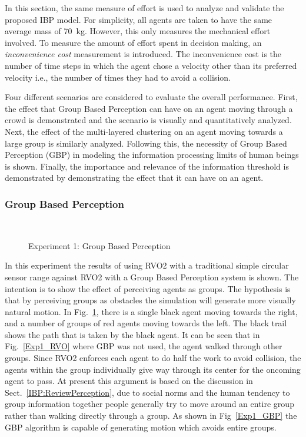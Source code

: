 In this section, the same measure of effort is used to analyze and validate the proposed IBP model. For simplicity, all agents are taken to have the same average mass of 70~kg.  However, this only measures the  mechanical effort involved. To measure the amount of effort spent in decision making, an \emph{inconvenience cost} measurement is introduced. The inconvenience cost is the number of time steps in which the agent chose a velocity other than its preferred velocity i.e., the number of times they had to avoid a collision.

Four different scenarios are considered to evaluate the overall performance. First, the effect that Group Based Perception can have on an agent moving through a crowd is demonstrated and the scenario is visually and quantitatively analyzed. Next, the effect of the multi-layered clustering on an agent moving towards a large group is similarly analyzed. Following this, the necessity of Group Based Perception (GBP) in modeling the information processing limits of human beings is shown. Finally, the importance and relevance of the information threshold is demonstrated by demonstrating the effect that it can have on an agent.

\subsubsection{Group Based Perception}
\label{GBP}

\begin{figure}[!tb]
  \centering
  \\
   \caption{Experiment 1: Group Based Perception}
  \label{Exp1}
\end{figure}


In this experiment the results of using RVO2 with a traditional simple circular sensor range against RVO2 with a Group Based Perception system is shown. The intention is to show the effect of perceiving agents as groups. The hypothesis is that by perceiving groups as obstacles the simulation will generate more visually natural motion. In Fig.~\ref{Exp1}, there is a single black agent moving towards the right, and a number of groups of red agents moving towards the left. The black trail shows the path that is taken by the black agent. It can be seen that in Fig.~\ref{Exp1_RVO} where GBP was not used, the agent walked through other groups. Since RVO2 enforces each agent to do half the work to avoid collision, the agents within the group individually give way through its center for the oncoming agent to pass. At present this argument is based on the discussion in Sect.~\ref{IBP:ReviewPerception}, due to social norms and the human tendency to group information together people generally try to move around an entire group rather than walking directly through a group. As shown in Fig~\ref{Exp1_GBP} the GBP algorithm is capable of generating motion which avoids entire groups.

